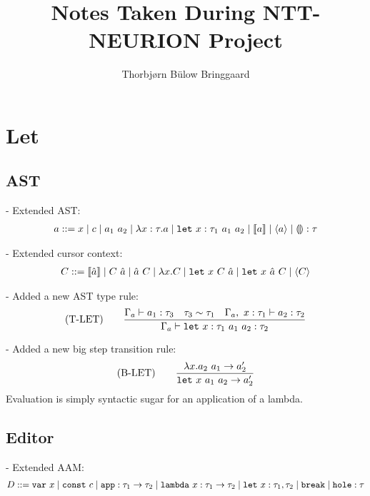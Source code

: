 \documentclass[10pt,a4paper,english]{article}
\newcommand\letin[3]{\texttt{let}~#1~#2~#3}
\begin{document}
\title{Notes Taken During NTT-NEURION Project}
\author{Thorbjørn Bülow Bringgaard}
\maketitle
{}
\tableofcontents
\newpage

\section{Let}
\subsection{AST}
- Extended AST:
\begin{align}
  a ::= x
  \mid c
  \mid \app{a_1}{a_2}
  \mid \abs{\bind{x}{\tau}}{a}
  \mid \letin{\bind{x}{\tau_1}}{a_1}{a_2}
  \mid \cursor{a}
  \mid \breakpoint{a}
  \mid \bind{\hole}{\tau}
\end{align}

- Extended cursor context:
\begin{align}
C ::= \cursor{\hat{a}}
\mid \app{C}{\hat{a}}
\mid \app{\hat{a}}{C}
\mid \abs{x}{C}
\mid \letin{x}{C}{\hat{a}}
\mid \letin{x}{\hat{a}}{C}
\mid \breakpoint{C}
\end{align}

- Added a new AST type rule:
\begin{align}
  (\text{T-LET})\qquad
\frac{\ctx{a} \vdash \bind{a_1}{\tau_3} \quad \tau_3\sim\tau_1 \quad \ctx{a},~\bind{x}{\tau_1} \vdash \bind{a_2}{\tau_2}}
{\ctx{a} \vdash \bind{\letin{\bind{x}{\tau_1}}{a_1}{a_2}}{\tau_2}}
\end{align}

- Added a new big step transition rule:
\begin{align}
(\text{B-LET})\qquad
\frac{\app{\abs{x}{a_2}}{a_1}\to a_2'}{\letin{x}{a_1}{a_2} \to a_2'}
\end{align}
Evaluation is simply syntactic sugar for an application of a lambda.

\subsection{Editor}
- Extended AAM:
\begin{align}
  D ::= \texttt{var}~x
  \mid \texttt{const}~c
  \mid \texttt{app} : \tau_1\to\tau_2
  \mid \texttt{lambda}~x : \tau_1\to\tau_2
  \mid \texttt{let}~x : \tau_1,\tau_2
  \mid \texttt{break}
  \mid \texttt{hole} : \tau
\end{align}
\end{document}
